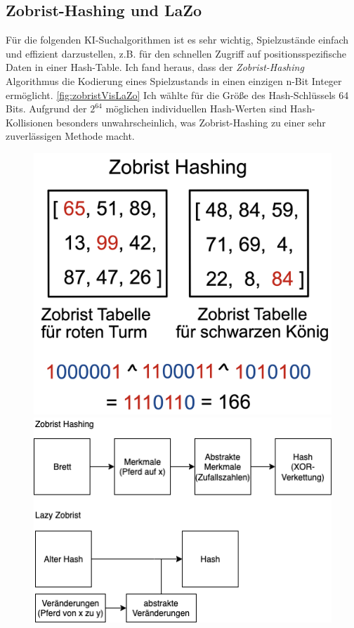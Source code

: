 \documentclass[
  manuscript=article,  %
  layout=publish,  %
  year=2023,
  volume=1,
]{extra/joas}
\begin{document}
  
\subsection{Zobrist-Hashing und LaZo}{\label{subsec:Zobrist}}
Für die folgenden KI-Suchalgorithmen ist es sehr wichtig, Spielzustände einfach und effizient darzustellen, z.B. für den schnellen Zugriff auf positionsspezifische Daten in einer Hash-Table. Ich fand heraus, dass der \textit{Zobrist-Hashing} Algorithmus die Kodierung eines Spielzustands in einen einzigen n-Bit Integer ermöglicht. \ref{fig:zobristVisLaZo} Ich wählte für die Größe des Hash-Schlüssels 64 Bits.
Aufgrund der  $2^{64}$ möglichen individuellen Hash-Werten sind Hash-Kollisionen besonders unwahrscheinlich, was Zobrist-Hashing zu einer sehr zuverlässigen Methode macht.

 \begin{figure}
    \centering
    \begin{minipage}{0.44\textwidth}
      \includegraphics[width=\textwidth]{imgs/zobristVis.png}
    \end{minipage}
    \hfill
    \begin{minipage}{0.49\textwidth}
      \includegraphics[width=\textwidth]{imgs/zobristVsLazo.png}

\end{minipage}
\end{figure}
\end{document}
